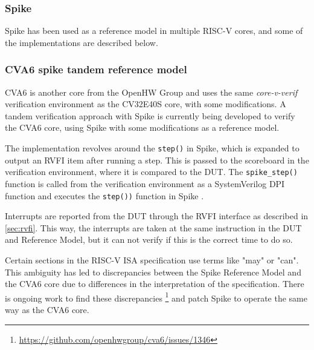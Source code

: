 \subsubsection{Spike}

Spike has been used as a reference model in multiple RISC-V cores, and some of the implementations are described below.

\subsubsection{CVA6 spike tandem reference model}
\label{back:cva6}

CVA6 is another core from the OpenHW Group and uses the same \textit{core-v-verif} verification environment as the CV32E40S core, with some modifications. A tandem verification approach with Spike is currently being developed to verify the CVA6 core, using Spike with some modifications as a reference model.

The implementation revolves around the \lstinline{step()} in Spike, which is expanded to output an RVFI item after running a step. This is passed to the scoreboard in the verification environment, where it is compared to the DUT. The \lstinline{spike_step()} function is called from the verification environment as a SystemVerilog DPI function and executes the \lstinline{step())} function in Spike \cite{openhwgroupOpenhwgroupCorevverif2023}.

Interrupts are reported from the DUT through the RVFI interface as described in \cref{sec:rvfi}. This way, the interrupts are taken at the same instruction in the DUT and Reference Model, but it can not verify if this is the correct time to do so.

Certain sections in the RISC-V ISA specification use terms like "may" or "can". This ambiguity has led to discrepancies between the Spike Reference Model and the CVA6 core due to differences in the interpretation of the specification. There is ongoing work to find these discrepancies \footnote{\url{https://github.com/openhwgroup/cva6/issues/1346}} and patch Spike to operate the same way as the CVA6 core. 

